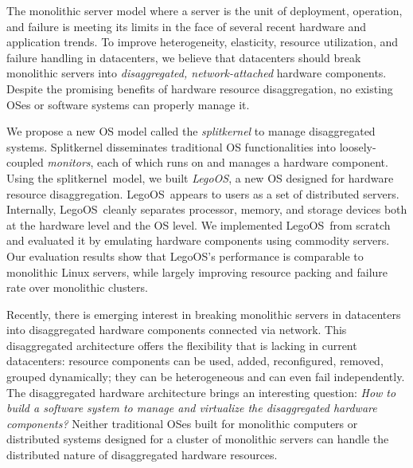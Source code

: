 \documentclass[10pt,times,twocolumn]{z2-article}
\renewcommand{\em}{\it}
\newcommand{\splitkernel}{splitkernel}
\newcommand{\lego}{LegoOS}
\newcommand{\microos}{monitor}
\begin{document}
The monolithic server model where a server is the unit of deployment, operation, and failure 
is meeting its limits in the face of several recent hardware and application trends. 
To improve heterogeneity, elasticity, resource utilization, and failure handling in datacenters, 
we believe that datacenters should break monolithic servers into {\em disaggregated, network-attached} hardware components. 
Despite the promising benefits of hardware resource disaggregation, 
no existing OSes or software systems can properly manage it.

We propose a new OS model called the {\em \splitkernel} to manage disaggregated systems. 
Splitkernel disseminates traditional OS functionalities into loosely-coupled {\em \microos{}s},
each of which runs on and manages a hardware component.
Using the \splitkernel\ model, we built {\em \lego}, 
a new OS designed for hardware resource disaggregation. 
\lego\ appears to users as a set of distributed servers.
Internally, \lego\ cleanly separates processor, memory, and storage devices 
both at the hardware level and the OS level.
We implemented \lego\ from scratch and evaluated it by emulating hardware components using commodity servers. 
Our evaluation results show that \lego's performance is comparable to monolithic Linux servers,
while largely improving resource packing and failure rate over monolithic clusters.




Recently, there is emerging interest in breaking monolithic servers in datacenters into disaggregated hardware components connected via network.
This disaggregated architecture offers the flexibility that is lacking in current datacenters:
resource components can be used, added, reconfigured, removed, grouped dynamically;
they can be heterogeneous and can even fail independently.
The disaggregated hardware architecture brings an interesting question:
{\em How to build a software system to manage and virtualize the disaggregated hardware components?}
Neither traditional OSes built for monolithic computers or distributed systems designed for a cluster of monolithic servers 
can handle the distributed nature of disaggregated hardware resources. 
\end{document}
